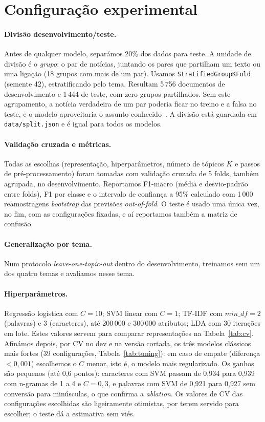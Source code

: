 \section{Configuração experimental}\label{sec:config}

\paragraph{Divisão desenvolvimento/teste.}
Antes de qualquer modelo, separámos 20\% dos dados para teste. A unidade de divisão é o
\emph{grupo}: o par de notícias, juntando os pares que partilham um texto ou uma ligação
(18 grupos com mais de um par). Usamos \texttt{StratifiedGroupKFold} (semente 42), estratificando
pelo tema. Resultam 5\,756 documentos de desenvolvimento e 1\,444 de teste, com zero grupos
partilhados. Sem este agrupamento, a notícia verdadeira de um par poderia ficar no treino e a
falsa no teste, e o modelo aproveitaria o assunto conhecido~\cite{kapoor2023}. A divisão está
guardada em \texttt{data/split.json} e é igual para todos os modelos.

\paragraph{Validação cruzada e métricas.}
Todas as escolhas (representação, hiperparâmetros, número de tópicos $K$ e passos de pré-processamento) foram tomadas com
validação cruzada de 5 folds, também agrupada, no desenvolvimento. Reportamos F1-macro (média e desvio-padrão entre folds), F1 por classe e o intervalo de confiança
a 95\% calculado com 1\,000 reamostragens \emph{bootstrap} das previsões \emph{out-of-fold}.
O teste é usado uma única vez, no fim,
com as configurações fixadas, e aí reportamos também a matriz de confusão.

\paragraph{Generalização por tema.}
Num protocolo \emph{leave-one-topic-out} dentro do desenvolvimento, treinamos sem um dos quatro
temas e avaliamos nesse tema.

\paragraph{Hiperparâmetros.}
Regressão logística com $C=10$; SVM linear com $C=1$; TF-IDF com $\mathit{min\_df}=2$ (palavras)
e 3 (caracteres), até 200\,000 e 300\,000 atributos; LDA com 30 iterações em lote.
Estes valores servem para comparar representações na Tabela~\ref{tab:cv}. Afinámos depois, por CV no
dev e na versão cortada, os três modelos clássicos mais fortes (39 configurações, Tabela~\ref{tab:tuning}):
em caso de empate (diferença $<0{,}001$) escolhemos o $C$ menor, isto é, o modelo mais regularizado.
Os ganhos são pequenos (até 0,6 pontos): caracteres com SVM passam de 0,934 para 0,939 com n-gramas de
1 a 4 e $C=0{,}3$, e palavras com SVM de 0,921 para 0,927 sem conversão para minúsculas, o que confirma
a \emph{ablation}. Os valores de CV das configurações escolhidas são ligeiramente otimistas, por terem
servido para escolher; o teste dá a estimativa sem viés.

